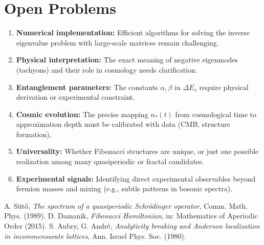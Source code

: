 \documentclass[12pt,a4paper]{article}
\begin{document}
\section{Open Problems}
\begin{enumerate}
    \item \textbf{Numerical implementation:} Efficient algorithms for solving the inverse eigenvalue problem with large-scale matrices remain challenging.  
    \item \textbf{Physical interpretation:} The exact meaning of negative eigenmodes (tachyons) and their role in cosmology needs clarification.  
    \item \textbf{Entanglement parameters:} The constants $\alpha, \beta$ in $\Delta E_s$ require physical derivation or experimental constraint.  
    \item \textbf{Cosmic evolution:} The precise mapping $n_*(t)$ from cosmological time to approximation depth must be calibrated with data (CMB, structure formation).  
    \item \textbf{Universality:} Whether Fibonacci structures are unique, or just one possible realization among many quasiperiodic or fractal candidates.  
    \item \textbf{Experimental signals:} Identifying direct experimental observables beyond fermion masses and mixing (e.g., subtle patterns in bosonic spectra).  
\end{enumerate}



\begin{thebibliography}{9}
 A. Sütő, \emph{The spectrum of a quasiperiodic Schrödinger operator}, Comm. Math. Phys. (1989).
 D. Damanik, \emph{Fibonacci Hamiltonian}, in: Mathematics of Aperiodic Order (2015).
 S. Aubry, G. André, \emph{Analyticity breaking and Anderson localization in incommensurate lattices}, Ann. Israel Phys. Soc. (1980).
\end{thebibliography}
\end{document}
